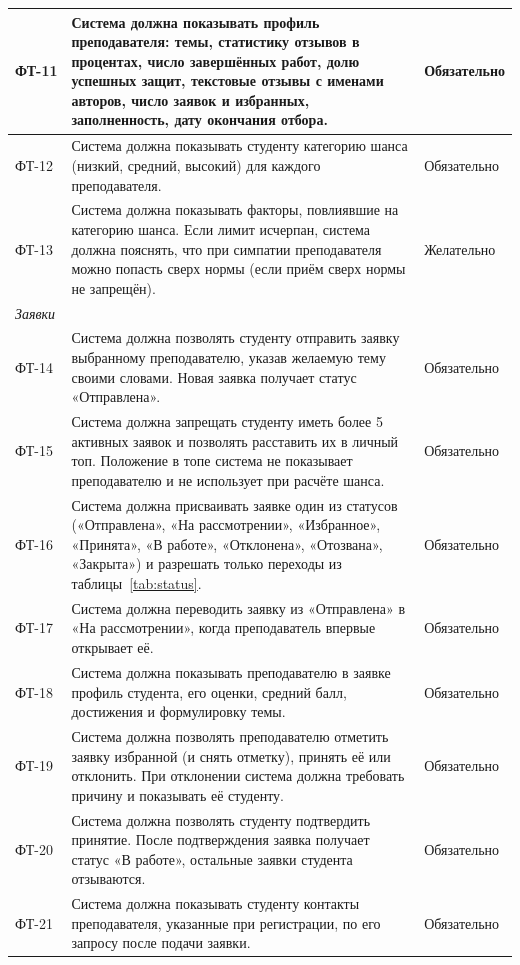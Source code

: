 \documentclass[a4paper,12pt]{article}
\begin{document}
{\begin{longtable}{|p{1.3cm}|p{11.1cm}|p{2.3cm}|}
ФТ-11 & Система должна показывать профиль преподавателя: темы, статистику отзывов в процентах, число завершённых работ, долю успешных защит, текстовые отзывы с именами авторов, число заявок и избранных, заполненность, дату окончания отбора. & Обязательно\\ \hline
ФТ-12 & Система должна показывать студенту категорию шанса (низкий, средний, высокий) для каждого преподавателя. & Обязательно\\ \hline
ФТ-13 & Система должна показывать факторы, повлиявшие на категорию шанса. Если лимит исчерпан, система должна пояснять, что при симпатии преподавателя можно попасть сверх нормы (если приём сверх нормы не запрещён). & Желательно\\ \hline
\multicolumn{3}{|l|}{\textit{Заявки}}\\ \hline
ФТ-14 & Система должна позволять студенту отправить заявку выбранному преподавателю, указав желаемую тему своими словами. Новая заявка получает статус «Отправлена». & Обязательно\\ \hline
ФТ-15 & Система должна запрещать студенту иметь более 5 активных заявок и позволять расставить их в личный топ. Положение в топе система не показывает преподавателю и не использует при расчёте шанса. & Обязательно\\ \hline
ФТ-16 & Система должна присваивать заявке один из статусов («Отправлена», «На рассмотрении», «Избранное», «Принята», «В работе», «Отклонена», «Отозвана», «Закрыта») и разрешать только переходы из таблицы~\ref{tab:status}. & Обязательно\\ \hline
ФТ-17 & Система должна переводить заявку из «Отправлена» в «На рассмотрении», когда преподаватель впервые открывает её. & Обязательно\\ \hline
ФТ-18 & Система должна показывать преподавателю в заявке профиль студента, его оценки, средний балл, достижения и формулировку темы. & Обязательно\\ \hline
ФТ-19 & Система должна позволять преподавателю отметить заявку избранной (и снять отметку), принять её или отклонить. При отклонении система должна требовать причину и показывать её студенту. & Обязательно\\ \hline
ФТ-20 & Система должна позволять студенту подтвердить принятие. После подтверждения заявка получает статус «В работе», остальные заявки студента отзываются. & Обязательно\\ \hline
ФТ-21 & Система должна показывать студенту контакты преподавателя, указанные при регистрации, по его запросу после подачи заявки. & Обязательно\\ \hline

\end{longtable}}
\end{document}
